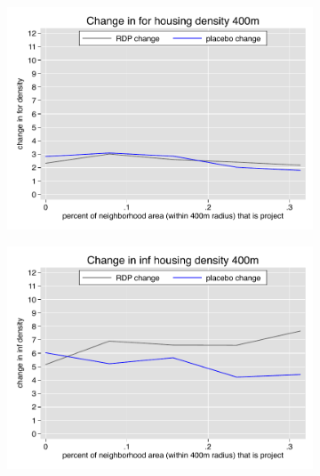 \documentclass[12pt]{article}
\begin{document}
\begin{figure}
\begin{subfigure}[b]{0.495\textwidth}
        \end{subfigure}
        \vspace{-6mm}
        \begin{subfigure}[b]{0.495\textwidth}
            \centering
            \includegraphics[width=\textwidth,trim={0.3cm .3cm 0.1cm 0cm}, clip=true]{figures/change_for_400_total.pdf}
        \end{subfigure}
        \hfill
        \begin{subfigure}[b]{0.495\textwidth}  
            \centering 
            \includegraphics[width=\textwidth,trim={0.3cm .3cm 0.1cm 0cm}, clip=true]{figures/change_inf_400_total.pdf}
        \end{subfigure}
        \vspace{-6mm}
    \end{figure} 
\end{document}
